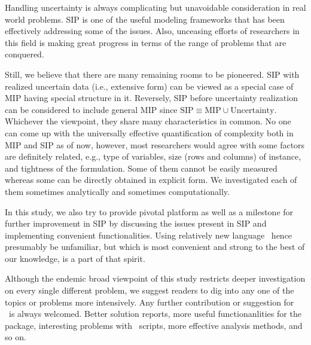 Handling uncertainty is always complicating but unavoidable consideration in real world problems. SIP is one of the useful modeling frameworks that has been effectively addressing some of the issues. Also, unceasing efforts of researchers in this field is making great progress in terms of the range of problems that are conquered. 

Still, we believe that there are many remaining rooms to be pioneered. SIP with realized uncertain data (i.e., extensive form) can be viewed as a special case of MIP having special structure in it. Reversely, SIP before uncertainty realization can be considered to include general MIP since $\textrm{SIP}\equiv\textrm{MIP}\cup\textrm{Uncertainty}$. Whichever the viewpoint, they share many characteristics in common. No one can come up with the universally effective quantification of complexity both in MIP and SIP as of now, however, most researchers would agree with some factors are definitely related, e.g., type of variables, size (rows and columns) of instance, and tightness of the formulation. Some of them cannot be easily measured whereas some can be directly obtained in explicit form. We investigated each of them sometimes analytically and sometimes computationally.

In this study, we also try to provide pivotal platform as well as a milestone for further improvement in SIP by discussing the issues present in SIP and implementing convenient functionalities. Using relatively new language \julia\ hence presumably be unfamiliar, but which is most convenient and strong to the best of our knowledge, is a part of that spirit. 

Although the endemic broad viewpoint of this study restricts deeper investigation on every single different problem, we suggest readers to dig into any one of the topics or problems more intensively. Any further contribution or suggestion for \siplibtwo\ is always welcomed. Better solution reports, more useful functionanlities for the package, interesting problems with \julia\ scripts, more effective analysis methods, and so on.
